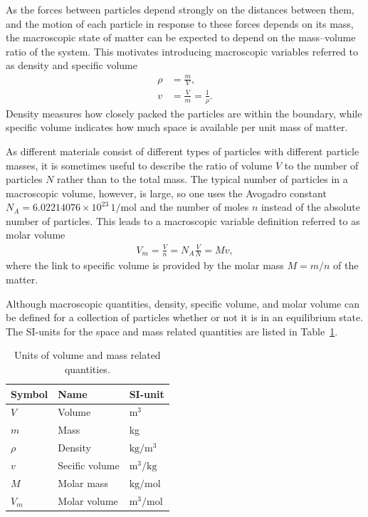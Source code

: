 As the forces between particles depend strongly on the distances between them, and the motion of each particle in response to these forces depends on its mass, the macroscopic state of matter can be expected to depend on the mass--volume ratio of the system. This motivates introducing macroscopic variables referred to as density and specific volume
\begin{align}
\rho &= \frac{m}{V},\\
v &= \frac{V}{m} = \frac{1}{\rho}.
\end{align}
Density measures how closely packed the particles are within the boundary, while specific volume indicates how much space is available per unit mass of matter. 

As different materials consist of different types of particles with different particle masses, it is sometimes useful to describe the ratio of volume $V$ to the number of particles $N$ rather than to the total mass. The typical number of particles in a macroscopic volume, however, is large, so one uses the Avogadro constant $N_A=6.02214076\times 10^{23}\,\text{1}/\text{mol}$ and the number of moles $n$ instead of the absolute number of particles. This leads to a macroscopic variable definition referred to as molar volume 
\begin{align}
    V_m=\frac{V}{n}=N_A\frac{V}{N}=Mv,
\end{align}
where the link to specific volume is provided by the molar mass $M=m/n$ of the matter.

Although macroscopic quantities, density, specific volume, and molar volume can be defined for a collection of particles whether or not it is in an equilibrium state. The SI-units for the space and mass related quantities are listed in Table~\ref{tab:volume-mass-related-units}.
\begin{table}[!htb]
    \centering
    \begin{threeparttable}
    \caption{Units of volume and mass related quantities.}
    \begin{tabular}{lll}
         \toprule 
         Symbol & Name & SI-unit \\
         \midrule 
         $V$ & Volume & m$^3$\\
         $m$ & Mass& kg\\
         $\rho$ & Density & $\text{kg}/\text{m}^3$\\
         $v$ & Secific volume & $\text{m}^3/\text{kg}$\\
         $M$ & Molar mass & $\text{kg}/\text{mol}$\\
         $V_m$ & Molar volume & $\text{m}^3/\text{mol}$\\
         \bottomrule
    \end{tabular}
    \end{threeparttable}
    \label{tab:volume-mass-related-units}
\end{table}

